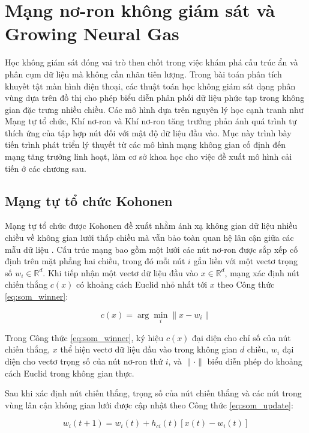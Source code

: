 \section{Mạng nơ-ron không giám sát và Growing Neural Gas}

Học không giám sát đóng vai trò then chốt trong việc khám phá cấu trúc ẩn và phân cụm dữ liệu mà không cần nhãn tiên lượng. Trong bài toán phân tích khuyết tật màn hình điện thoại, các thuật toán học không giám sát dạng phân vùng dựa trên đồ thị cho phép biểu diễn phân phối dữ liệu phức tạp trong không gian đặc trưng nhiều chiều. Các mô hình dựa trên nguyên lý học cạnh tranh như Mạng tự tổ chức, Khí nơ-ron và Khí nơ-ron tăng trưởng phản ánh quá trình tự thích ứng của tập hợp nút đối với mật độ dữ liệu đầu vào. Mục này trình bày tiến trình phát triển lý thuyết từ các mô hình mạng không gian cố định đến mạng tăng trưởng linh hoạt, làm cơ sở khoa học cho việc đề xuất mô hình cải tiến ở các chương sau.

\subsection{Mạng tự tổ chức Kohonen}

Mạng tự tổ chức được Kohonen đề xuất nhằm ánh xạ không gian dữ liệu nhiều chiều về không gian lưới thấp chiều mà vẫn bảo toàn quan hệ lân cận giữa các mẫu dữ liệu \cite{kohonen1982self}. Cấu trúc mạng bao gồm một lưới các nút nơ-ron được sắp xếp cố định trên mặt phẳng hai chiều, trong đó mỗi nút $i$ gắn liền với một vectơ trọng số $w_i \in \mathbb{R}^d$. Khi tiếp nhận một vectơ dữ liệu đầu vào $x \in \mathbb{R}^d$, mạng xác định nút chiến thắng $c(x)$ có khoảng cách Euclid nhỏ nhất tới $x$ theo Công thức \ref{eq:som_winner}:

\begin{equation}
c(x) = \arg\min_i \|x - w_i\|
\label{eq:som_winner}
\end{equation}

Trong Công thức \ref{eq:som_winner}, ký hiệu $c(x)$ đại diện cho chỉ số của nút chiến thắng, $x$ thể hiện vectơ dữ liệu đầu vào trong không gian $d$ chiều, $w_i$ đại diện cho vectơ trọng số của nút nơ-ron thứ $i$, và $\| \cdot \|$ biểu diễn phép đo khoảng cách Euclid trong không gian thực.

Sau khi xác định nút chiến thắng, trọng số của nút chiến thắng và các nút trong vùng lân cận không gian lưới được cập nhật theo Công thức \ref{eq:som_update}:

\begin{equation}
w_i(t+1) = w_i(t) + h_{ci}(t) \left[ x(t) - w_i(t) \right]
\label{eq:som_update}
\end{equation}

